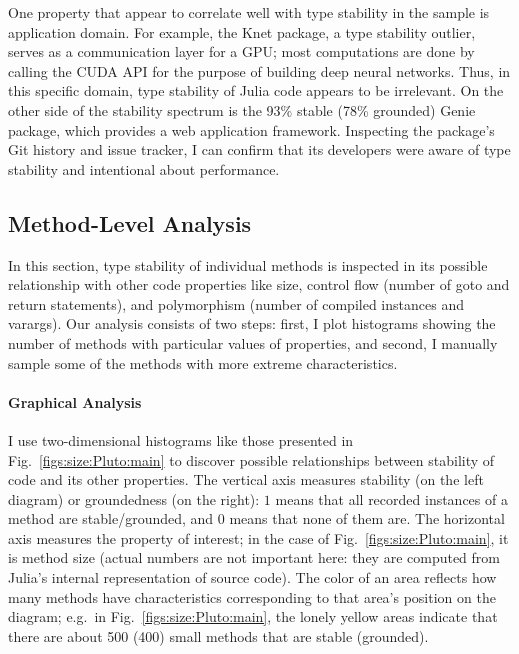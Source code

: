 \documentclass[oneside,openright,titlepage,numbers=noenddot,%
headinclude,footinclude,cleardoublepage=empty,abstract=on,
BCOR=5mm,paper=a4,fontsize=11pt,
dvipsnames
]{scrreprt}
\begin{document}
One property that appear to correlate well with type stability in the sample is
application domain. For example, the Knet package, a type stability outlier,
serves as a communication layer for a GPU; most computations are done by calling
the CUDA API for the purpose of building deep neural networks. Thus, in this
specific domain, type stability of Julia code appears to be irrelevant. On the
other side of the stability spectrum is the 93\% stable (78\% grounded) Genie
package, which provides a web application framework. Inspecting the package's
Git history and issue tracker, I can confirm that its developers were aware of
type stability and intentional about performance.


\subsection{Method-Level Analysis}


In this section,
type stability of
individual methods is inspected
in its possible
relationship with other code properties like size, control flow (number of goto
and return statements), and polymorphism (number of compiled instances and varargs).
Our analysis consists of two steps: first, I plot histograms
showing the number of methods with particular values of properties, and second,
I manually sample some of the methods with more extreme characteristics.

\paragraph{Graphical Analysis}\label{sssect:graphs}

I use two-dimensional histograms like those presented in
Fig.~\ref{figs:size:Pluto:main} to discover possible relationships between stability
of code and its other properties. The vertical axis measures stability (on the
left diagram) or groundedness (on the right): $1$ means that all recorded
instances of a method are stable/grounded, and $0$ means that none of them are.
The horizontal axis measures the property of interest; in the case of
Fig.~\ref{figs:size:Pluto:main}, it is method size (actual numbers are not
important here: they are computed from Julia's internal representation of source
code). The color of an area reflects how many methods have characteristics
corresponding to that area's position on the diagram; e.g.\ in
Fig.~\ref{figs:size:Pluto:main}, the lonely yellow areas indicate that there are about
500 (400) small methods that are stable (grounded).
\end{document}
